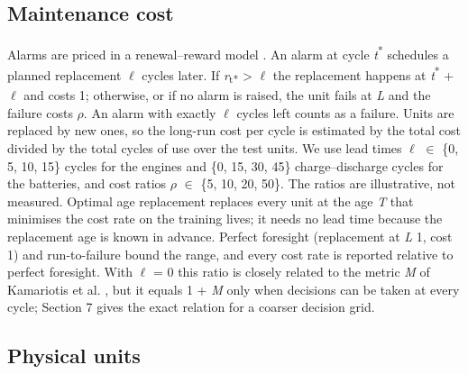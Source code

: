 \documentclass[a4paper,fleqn,doubleblind]{cas-dc}
\begin{document}
\subsection{Maintenance cost}

Alarms are priced in a renewal--reward model \cite{barlow1960}. An alarm at cycle \textit{t}\textsuperscript{*} schedules a planned replacement $\ell$ cycles later. If \textit{r}\textsubscript{t*} > $\ell$ the replacement happens at \textit{t}\textsuperscript{*} + $\ell$ and costs 1; otherwise, or if no alarm is raised, the unit fails at \textit{L} and the failure costs $\rho$. An alarm with exactly $\ell$ cycles left counts as a failure. Units are replaced by new ones, so the long-run cost per cycle is estimated by the total cost divided by the total cycles of use over the test units. We use lead times $\ell$ $\in$ \{0, 5, 10, 15\} cycles for the engines and \{0, 15, 30, 45\} charge--discharge cycles for the batteries, and cost ratios $\rho$ $\in$ \{5, 10, 20, 50\}. The ratios are illustrative, not measured. Optimal age replacement replaces every unit at the age \textit{T} that minimises the cost rate on the training lives; it needs no lead time because the replacement age is known in advance. Perfect foresight (replacement at \textit{L} \textminus{} 1, cost 1) and run-to-failure bound the range, and every cost rate is reported relative to perfect foresight. With $\ell$ = 0 this ratio is closely related to the metric \textit{M} of Kamariotis et al. \cite{kamariotis2024}, but it equals 1 + \textit{M} only when decisions can be taken at every cycle; Section 7 gives the exact relation for a coarser decision grid.

\subsection{Physical units}
\end{document}
